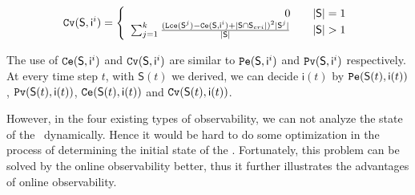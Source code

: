 \begin{definition} 
\[\Cv(\mathsf{S}, \mathsf{ i}^{i})=\left\{
\begin{array}{rcl}
0     &      & {|\mathsf{S}|=1}\\
\sum_{j=1}^k\frac{ (\Lce(\mathsf{S}^{j})-\Ce(\mathsf{S}, \mathsf{ i}^{i})+|\mathsf{S} \cap \mathsf{S}_{cri}|)^2 |\mathsf{S}^{j}|}{ |\mathsf{S}|}    &      & {|\mathsf{S}|>1}
\end{array} \right. \]
\end{definition}

The use of ${\tt Ce}(\mathsf{S}, \mathsf{ i}^{i})$ and ${\tt Cv}(\mathsf{S}, \mathsf{ i}^{i})$ are similar to ${\tt Pe}(\mathsf{S}, \mathsf{ i}^{i})$ and ${\tt Pv}(\mathsf{S}, \mathsf{ i}^{i})$ respectively. At every time step $t$, with $\mathsf{S}(t)$ we derived, we can decide $\mathsf{i}(t)$ by $ {\tt Pe}(\mathsf{S}(t), \mathsf{ i}(t))$, ${\tt Pv}(\mathsf{S}(t), \mathsf{ i}(t))$, ${\tt Ce}(\mathsf{S}(t), \mathsf{ i}(t))$ and ${\tt Cv}(\mathsf{S}(t), \mathsf{ i}(t))$.

However, in the four existing types of observability, we can not analyze the state of the \BCNs\ dynamically. Hence it would be hard to do some optimization in the process of determining the initial state of the \BCNs. Fortunately, this problem can be solved by the online observability better, thus it further illustrates the advantages of online observability.